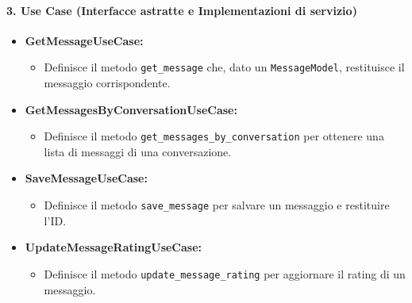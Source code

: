     \paragraph{3. Use Case (Interfacce astratte e Implementazioni di servizio)}
    \begin{itemize}
        \item \textbf{GetMessageUseCase:}
        \begin{itemize}
            \item Definisce il metodo \texttt{get\_message} che, dato un \texttt{MessageModel}, restituisce il messaggio corrispondente.
        \end{itemize}
        \item \textbf{GetMessagesByConversationUseCase:}
        \begin{itemize}
            \item Definisce il metodo \texttt{get\_messages\_by\_conversation} per ottenere una lista di messaggi di una conversazione.
        \end{itemize}
        \item \textbf{SaveMessageUseCase:}
        \begin{itemize}
            \item Definisce il metodo \texttt{save\_message} per salvare un messaggio e restituire l'ID.
        \end{itemize}
        \item \textbf{UpdateMessageRatingUseCase:}
        \begin{itemize}
            \item Definisce il metodo \texttt{update\_message\_rating} per aggiornare il rating di un messaggio.
        \end{itemize}
    \end{itemize}

